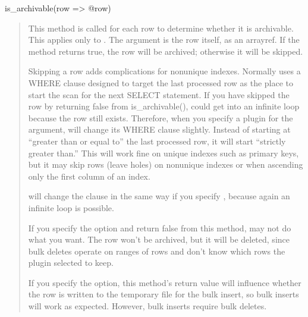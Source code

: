 \documentclass[letterpaper,10pt,english]{sphinxmanual}
\begin{document}
\sphinxAtStartPar
is\_archivable(row =\textgreater{} @row)
\begin{quote}

\sphinxAtStartPar
This method is called for each row to determine whether it is archivable.  This
applies only to {\hyperref[\detokenize{mariadb-archiver:cmdoption-mariadb-archiver-source}]{}}.  The argument is the row itself, as an arrayref.
If the method returns true, the row will be archived; otherwise it will be
skipped.

\sphinxAtStartPar
Skipping a row adds complications for non\sphinxhyphen{}unique indexes.  Normally
 uses a WHERE clause designed to target the last processed row as
the place to start the scan for the next SELECT statement.  If you have skipped
the row by returning false from is\_archivable(),  could get into
an infinite loop because the row still exists.  Therefore, when you specify a
plugin for the {\hyperref[\detokenize{mariadb-archiver:cmdoption-mariadb-archiver-source}]{}} argument,  will change its WHERE clause
slightly.  Instead of starting at “greater than or equal to” the last processed
row, it will start “strictly greater than.”  This will work fine on unique
indexes such as primary keys, but it may skip rows (leave holes) on non\sphinxhyphen{}unique
indexes or when ascending only the first column of an index.

\sphinxAtStartPar
{} will change the clause in the same way if you specify
{\hyperref[\detokenize{mariadb-archiver:cmdoption-mariadb-archiver-no-delete}]{}}, because again an infinite loop is possible.

\sphinxAtStartPar
If you specify the {\hyperref[\detokenize{mariadb-archiver:cmdoption-mariadb-archiver-bulk-delete}]{}} option and return false from this method,
 may not do what you want.  The row won’t be archived, but it will
be deleted, since bulk deletes operate on ranges of rows and don’t know which
rows the plugin selected to keep.

\sphinxAtStartPar
If you specify the {\hyperref[\detokenize{mariadb-archiver:cmdoption-mariadb-archiver-bulk-insert}]{}} option, this method’s return value will
influence whether the row is written to the temporary file for the bulk insert,
so bulk inserts will work as expected.  However, bulk inserts require bulk
deletes.
\end{quote}
\end{document}
